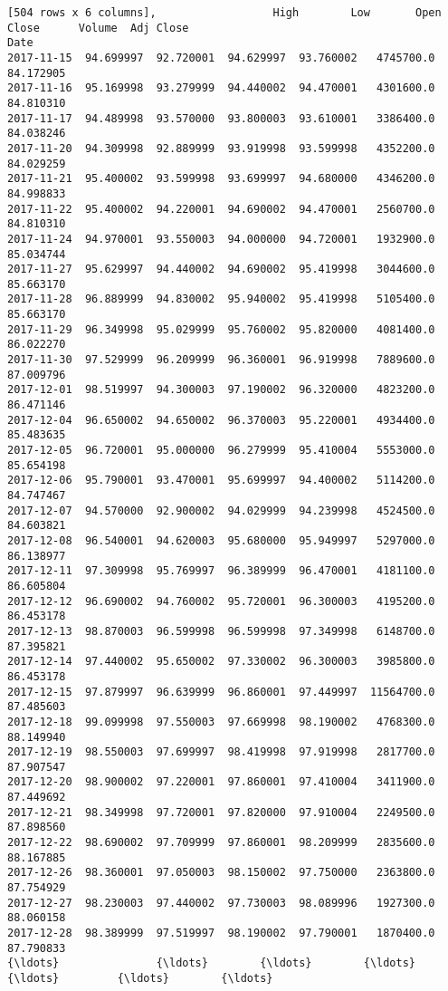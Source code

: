 \documentclass[11pt]{article}
\begin{document}
\begin{Verbatim}[commandchars=\\\{\}]
[504 rows x 6 columns],                  High        Low       Open      Close      Volume  Adj Close
Date                                                                         
2017-11-15  94.699997  92.720001  94.629997  93.760002   4745700.0  84.172905
2017-11-16  95.169998  93.279999  94.440002  94.470001   4301600.0  84.810310
2017-11-17  94.489998  93.570000  93.800003  93.610001   3386400.0  84.038246
2017-11-20  94.309998  92.889999  93.919998  93.599998   4352200.0  84.029259
2017-11-21  95.400002  93.599998  93.699997  94.680000   4346200.0  84.998833
2017-11-22  95.400002  94.220001  94.690002  94.470001   2560700.0  84.810310
2017-11-24  94.970001  93.550003  94.000000  94.720001   1932900.0  85.034744
2017-11-27  95.629997  94.440002  94.690002  95.419998   3044600.0  85.663170
2017-11-28  96.889999  94.830002  95.940002  95.419998   5105400.0  85.663170
2017-11-29  96.349998  95.029999  95.760002  95.820000   4081400.0  86.022270
2017-11-30  97.529999  96.209999  96.360001  96.919998   7889600.0  87.009796
2017-12-01  98.519997  94.300003  97.190002  96.320000   4823200.0  86.471146
2017-12-04  96.650002  94.650002  96.370003  95.220001   4934400.0  85.483635
2017-12-05  96.720001  95.000000  96.279999  95.410004   5553000.0  85.654198
2017-12-06  95.790001  93.470001  95.699997  94.400002   5114200.0  84.747467
2017-12-07  94.570000  92.900002  94.029999  94.239998   4524500.0  84.603821
2017-12-08  96.540001  94.620003  95.680000  95.949997   5297000.0  86.138977
2017-12-11  97.309998  95.769997  96.389999  96.470001   4181100.0  86.605804
2017-12-12  96.690002  94.760002  95.720001  96.300003   4195200.0  86.453178
2017-12-13  98.870003  96.599998  96.599998  97.349998   6148700.0  87.395821
2017-12-14  97.440002  95.650002  97.330002  96.300003   3985800.0  86.453178
2017-12-15  97.879997  96.639999  96.860001  97.449997  11564700.0  87.485603
2017-12-18  99.099998  97.550003  97.669998  98.190002   4768300.0  88.149940
2017-12-19  98.550003  97.699997  98.419998  97.919998   2817700.0  87.907547
2017-12-20  98.900002  97.220001  97.860001  97.410004   3411900.0  87.449692
2017-12-21  98.349998  97.720001  97.820000  97.910004   2249500.0  87.898560
2017-12-22  98.690002  97.709999  97.860001  98.209999   2835600.0  88.167885
2017-12-26  98.360001  97.050003  98.150002  97.750000   2363800.0  87.754929
2017-12-27  98.230003  97.440002  97.730003  98.089996   1927300.0  88.060158
2017-12-28  98.389999  97.519997  98.190002  97.790001   1870400.0  87.790833
{\ldots}               {\ldots}        {\ldots}        {\ldots}        {\ldots}         {\ldots}        {\ldots}

\end{Verbatim}
\end{document}
